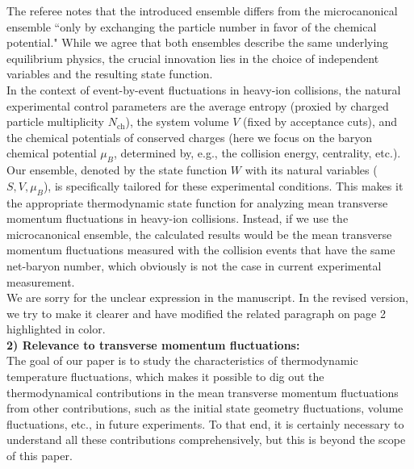 \documentclass[aps,article,author-year,notitlepage,showpacs]{revtex4-2}
\begin{document}
\begin{itemize}
The referee notes that the introduced ensemble differs from the microcanonical ensemble ``only by exchanging the particle number in favor of the chemical potential." While we agree that both ensembles describe the same underlying equilibrium physics, the crucial innovation lies in the choice of independent variables and the resulting state function.\\[-2ex]

In the context of event-by-event fluctuations in heavy-ion collisions, the natural experimental control parameters are the average entropy (proxied by charged particle multiplicity $N_{\mathrm{ch}}$), the system volume $V$ (fixed by acceptance cuts), and the chemical potentials of conserved charges (here we focus on the baryon chemical potential $\mu_B$, determined by, e.g., the collision energy, centrality, etc.). Our ensemble, denoted by the state function $W$ with its natural variables ($S, V, \mu_B$), is specifically tailored for these experimental conditions. This makes it the appropriate thermodynamic state function for analyzing mean transverse momentum fluctuations in heavy-ion collisions. Instead, if we use the microcanonical ensemble, the calculated results would be the mean transverse momentum fluctuations measured with the collision events that have the same net-baryon number, which obviously is not the case in current experimental measurement.\\[-2ex]

We are sorry for the unclear expression in the manuscript. In the revised version, we try to make it clearer and have modified the related paragraph on page 2 highlighted in color. \\[-1ex]

{\bf 2) Relevance to transverse momentum fluctuations:}\\[-2ex]

The goal of our paper is to study the characteristics of thermodynamic temperature fluctuations, which makes it possible to dig out the thermodynamical contributions in the mean transverse momentum fluctuations from other contributions, such as the initial state geometry fluctuations, volume fluctuations, etc., in future experiments. To that end, it is certainly necessary to understand all these contributions comprehensively, but this is beyond the scope of this paper.\\[-2ex]


\end{itemize}
\end{document}
